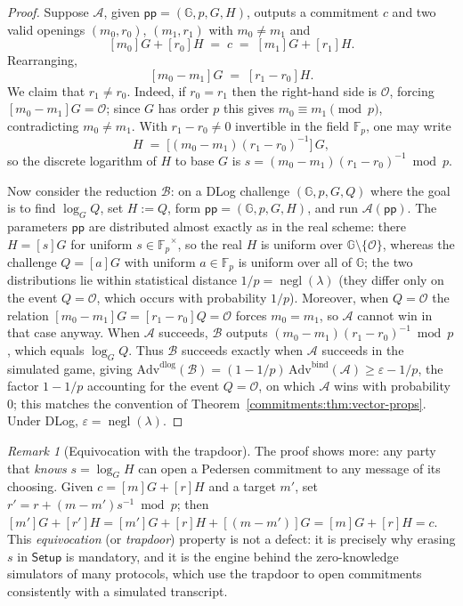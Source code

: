 \documentclass[11pt,a4paper]{article}
\theoremstyle{definition}
\theoremstyle{remark}
\newtheorem{remark}[theorem]{Remark}
\newcommand{\G}{\ensuremath{\mathbb{G}}}
\newcommand{\Fp}{\ensuremath{\mathbb{F}_{p}}}
\DeclareMathOperator{\negl}{negl}
\begin{document}
\begin{proof}
Suppose \(\mathcal{A}\), given \(\mathsf{pp} = (\G, p, G, H)\), outputs a commitment \(c\) and two valid openings \((m_0, r_0)\), \((m_1, r_1)\) with \(m_0 \neq m_1\) and
\[
  [m_0]G + [r_0]H \;=\; c \;=\; [m_1]G + [r_1]H.
\]
Rearranging,
\[
  [m_0 - m_1]G \;=\; [r_1 - r_0]H.
\]
We claim that \(r_1 \neq r_0\). Indeed, if \(r_0 = r_1\) then the right-hand side is \(\mathcal{O}\), forcing \([m_0 - m_1]G = \mathcal{O}\); since \(G\) has order \(p\) this gives \(m_0 \equiv m_1 \pmod p\), contradicting \(m_0 \neq m_1\). With \(r_1 - r_0 \neq 0\) invertible in the field \(\Fp\), one may write
\[
  H \;=\; \bigl[(m_0 - m_1)(r_1 - r_0)^{-1}\bigr]\,G,
\]
so the discrete logarithm of \(H\) to base \(G\) is \(s = (m_0 - m_1)(r_1 - r_0)^{-1} \bmod p\).

Now consider the reduction \(\mathcal{B}\): on a DLog challenge \((\G, p, G, Q)\) where the goal is to find \(\log_G Q\), set \(H := Q\), form \(\mathsf{pp} = (\G, p, G, H)\), and run \(\mathcal{A}(\mathsf{pp})\). The parameters \(\mathsf{pp}\) are distributed almost exactly as in the real scheme: there \(H = [s]G\) for uniform \(s \in \Fp^\times\), so the real \(H\) is uniform over \(\G \setminus \{\mathcal{O}\}\), whereas the challenge \(Q = [a]G\) with uniform \(a \in \Fp\) is uniform over all of \(\G\); the two distributions lie within statistical distance \(1/p = \negl(\lambda)\) (they differ only on the event \(Q = \mathcal{O}\), which occurs with probability \(1/p\)). Moreover, when \(Q = \mathcal{O}\) the relation \([m_0 - m_1]G = [r_1 - r_0]Q = \mathcal{O}\) forces \(m_0 = m_1\), so \(\mathcal{A}\) cannot win in that case anyway. When \(\mathcal{A}\) succeeds, \(\mathcal{B}\) outputs \((m_0 - m_1)(r_1 - r_0)^{-1} \bmod p\), which equals \(\log_G Q\). Thus \(\mathcal{B}\) succeeds exactly when \(\mathcal{A}\) succeeds in the simulated game, giving \(\mathrm{Adv}^{\mathrm{dlog}}(\mathcal{B}) = (1 - 1/p)\,\mathrm{Adv}^{\mathrm{bind}}(\mathcal{A}) \ge \varepsilon - 1/p\), the factor \(1 - 1/p\) accounting for the event \(Q = \mathcal{O}\), on which \(\mathcal{A}\) wins with probability \(0\); this matches the convention of Theorem~\ref{commitments:thm:vector-props}. Under DLog, \(\varepsilon = \negl(\lambda)\).
\end{proof}

\begin{remark}[Equivocation with the trapdoor]\label{commitments:rem:equivocation}
The proof shows more: any party that \emph{knows} \(s = \log_G H\) can open a Pedersen commitment to any message of its choosing. Given \(c = [m]G + [r]H\) and a target \(m'\), set \(r' = r + (m - m') s^{-1} \bmod p\); then \([m']G + [r']H = [m']G + [r]H + [(m - m')]G = [m]G + [r]H = c\). This \emph{equivocation} (or \emph{trapdoor}) property is not a defect: it is precisely why erasing \(s\) in \(\mathsf{Setup}\) is mandatory, and it is the engine behind the zero-knowledge simulators of many protocols, which use the trapdoor to open commitments consistently with a simulated transcript.
\end{remark}
\end{document}

